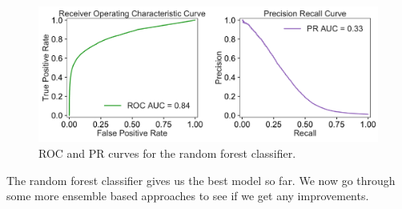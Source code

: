 \documentclass[12pt]{article}
\begin{document}
 \begin{figure}[!h]
\begin{center}
\includegraphics[width=6in]{RF_ROC_PR_plots.pdf}
\end{center}
\caption{\label{fig:RF}
ROC and PR curves for the random forest classifier.}
\end{figure}
The random forest classifier gives us the best model so far. We now go through some more ensemble based approaches to see if we get any improvements.
\end{document}
